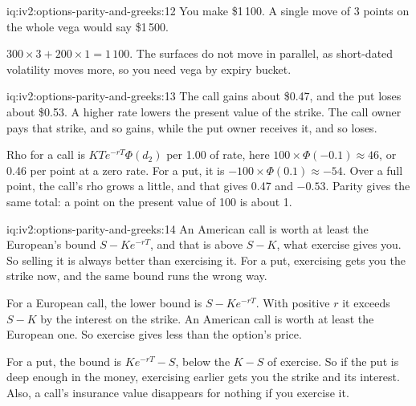 \begin{solution}{iq:iv2:options-parity-and-greeks:12}
You make \$1\,100. A single move of 3 points on the whole vega would say \$1\,500.

$300 \times 3 + 200 \times 1 = 1\,100$. The surfaces do not move in parallel, as short-dated volatility moves more, so you need vega by expiry bucket.

\end{solution}

\begin{solution}{iq:iv2:options-parity-and-greeks:13}
The call gains about \$0.47, and the put loses about \$0.53. A higher rate lowers the present value of the strike. The call owner pays that strike, and so gains, while the put owner receives it, and so loses.

Rho for a call is $KTe^{-rT}\Phi(d_2)$ per 1.00 of rate, here $100 \times \Phi(-0.1) \approx 46$, or 0.46 per point at a zero rate. For a put, it is $-100 \times \Phi(0.1) \approx -54$. Over a full point, the call's rho grows a little, and that gives 0.47 and $-0.53$. Parity gives the same total: a point on the present value of 100 is about 1.

\end{solution}

\begin{solution}{iq:iv2:options-parity-and-greeks:14}
An American call is worth at least the European's bound $S - Ke^{-rT}$, and that is above $S - K$, what exercise gives you. So selling it is always better than exercising it. For a put, exercising gets you the strike now, and the same bound runs the wrong way.

For a European call, the lower bound is $S - Ke^{-rT}$. With positive $r$ it exceeds $S - K$ by the interest on the strike. An American call is worth at least the European one. So exercise gives less than the option's price.

For a put, the bound is $Ke^{-rT} - S$, below the $K - S$ of exercise. So if the put is deep enough in the money, exercising earlier gets you the strike and its interest. Also, a call's insurance value disappears for nothing if you exercise it.

\end{solution}

